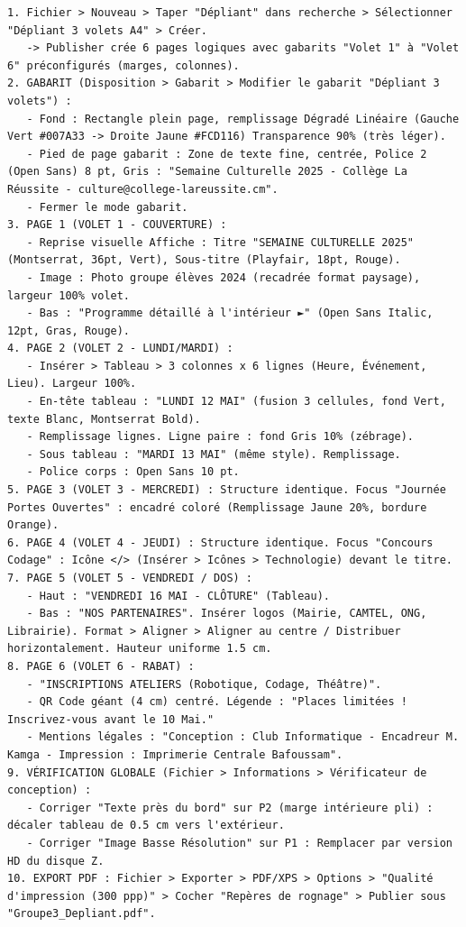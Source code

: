 \documentclass[11pt]{article}
\begin{document}
\begin{exoresolu}
\begin{lstlisting}[language=text, title={Journal d'actions Publisher - Dépliant}]
1. Fichier > Nouveau > Taper "Dépliant" dans recherche > Sélectionner "Dépliant 3 volets A4" > Créer.
   -> Publisher crée 6 pages logiques avec gabarits "Volet 1" à "Volet 6" préconfigurés (marges, colonnes).
2. GABARIT (Disposition > Gabarit > Modifier le gabarit "Dépliant 3 volets") :
   - Fond : Rectangle plein page, remplissage Dégradé Linéaire (Gauche Vert #007A33 -> Droite Jaune #FCD116) Transparence 90% (très léger).
   - Pied de page gabarit : Zone de texte fine, centrée, Police 2 (Open Sans) 8 pt, Gris : "Semaine Culturelle 2025 - Collège La Réussite - culture@college-lareussite.cm".
   - Fermer le mode gabarit.
3. PAGE 1 (VOLET 1 - COUVERTURE) :
   - Reprise visuelle Affiche : Titre "SEMAINE CULTURELLE 2025" (Montserrat, 36pt, Vert), Sous-titre (Playfair, 18pt, Rouge).
   - Image : Photo groupe élèves 2024 (recadrée format paysage), largeur 100% volet.
   - Bas : "Programme détaillé à l'intérieur ►" (Open Sans Italic, 12pt, Gras, Rouge).
4. PAGE 2 (VOLET 2 - LUNDI/MARDI) :
   - Insérer > Tableau > 3 colonnes x 6 lignes (Heure, Événement, Lieu). Largeur 100%.
   - En-tête tableau : "LUNDI 12 MAI" (fusion 3 cellules, fond Vert, texte Blanc, Montserrat Bold).
   - Remplissage lignes. Ligne paire : fond Gris 10% (zébrage).
   - Sous tableau : "MARDI 13 MAI" (même style). Remplissage.
   - Police corps : Open Sans 10 pt.
5. PAGE 3 (VOLET 3 - MERCREDI) : Structure identique. Focus "Journée Portes Ouvertes" : encadré coloré (Remplissage Jaune 20%, bordure Orange).
6. PAGE 4 (VOLET 4 - JEUDI) : Structure identique. Focus "Concours Codage" : Icône </> (Insérer > Icônes > Technologie) devant le titre.
7. PAGE 5 (VOLET 5 - VENDREDI / DOS) :
   - Haut : "VENDREDI 16 MAI - CLÔTURE" (Tableau).
   - Bas : "NOS PARTENAIRES". Insérer logos (Mairie, CAMTEL, ONG, Librairie). Format > Aligner > Aligner au centre / Distribuer horizontalement. Hauteur uniforme 1.5 cm.
8. PAGE 6 (VOLET 6 - RABAT) :
   - "INSCRIPTIONS ATELIERS (Robotique, Codage, Théâtre)".
   - QR Code géant (4 cm) centré. Légende : "Places limitées ! Inscrivez-vous avant le 10 Mai."
   - Mentions légales : "Conception : Club Informatique - Encadreur M. Kamga - Impression : Imprimerie Centrale Bafoussam".
9. VÉRIFICATION GLOBALE (Fichier > Informations > Vérificateur de conception) :
   - Corriger "Texte près du bord" sur P2 (marge intérieure pli) : décaler tableau de 0.5 cm vers l'extérieur.
   - Corriger "Image Basse Résolution" sur P1 : Remplacer par version HD du disque Z.
10. EXPORT PDF : Fichier > Exporter > PDF/XPS > Options > "Qualité d'impression (300 ppp)" > Cocher "Repères de rognage" > Publier sous "Groupe3_Depliant.pdf".
\end{lstlisting}


\end{exoresolu}
\end{document}
